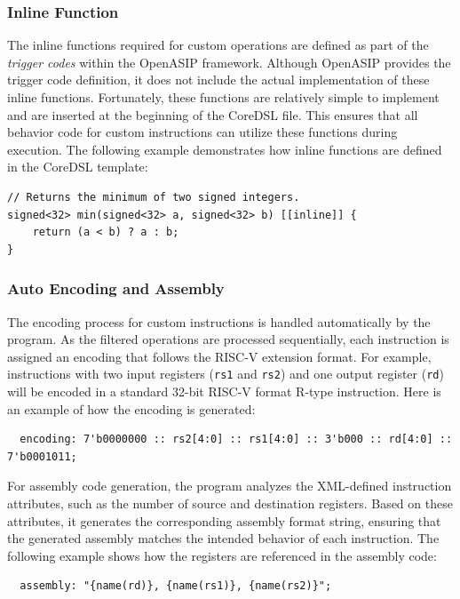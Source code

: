 \subsubsection{Inline Function}

The inline functions required for custom operations are defined as part of the \textit{trigger codes} within the OpenASIP framework. Although OpenASIP provides the trigger code definition, it does not include the actual implementation of these inline functions. Fortunately, these functions are relatively simple to implement and are inserted at the beginning of the CoreDSL file. This ensures that all behavior code for custom instructions can utilize these functions during execution. The following example demonstrates how inline functions are defined in the CoreDSL template:

\begin{lstlisting}
// Returns the minimum of two signed integers.
signed<32> min(signed<32> a, signed<32> b) [[inline]] {
    return (a < b) ? a : b;
}
\end{lstlisting}

\subsubsection{Auto Encoding and Assembly}

The encoding process for custom instructions is handled automatically by the program. As the filtered operations are processed sequentially, each instruction is assigned an encoding that follows the RISC-V extension format. For example, instructions with two input registers (\texttt{rs1} and \texttt{rs2}) and one output register (\texttt{rd}) will be encoded in a standard 32-bit RISC-V format R-type instruction. Here is an example of how the encoding is generated:

\begin{lstlisting}
  encoding: 7'b0000000 :: rs2[4:0] :: rs1[4:0] :: 3'b000 :: rd[4:0] :: 7'b0001011;
\end{lstlisting}

For assembly code generation, the program analyzes the XML-defined instruction attributes, such as the number of source and destination registers. Based on these attributes, it generates the corresponding assembly format string, ensuring that the generated assembly matches the intended behavior of each instruction. The following example shows how the registers are referenced in the assembly code:

\begin{lstlisting}
  assembly: "{name(rd)}, {name(rs1)}, {name(rs2)}";
\end{lstlisting}

